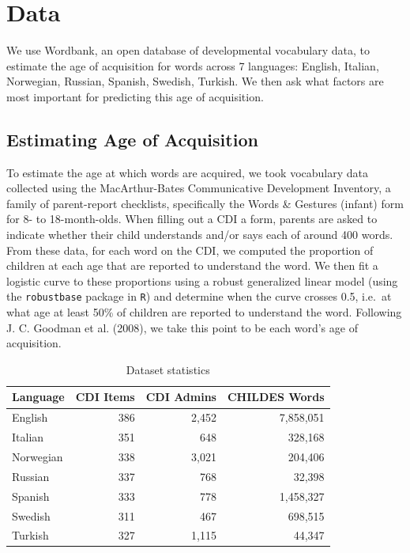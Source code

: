 \documentclass[10pt, letterpaper]{article}
\begin{document}
\section{Data}\label{data}

We use Wordbank, an open database of developmental vocabulary data, to
estimate the age of acquisition for words across 7 languages: English,
Italian, Norwegian, Russian, Spanish, Swedish, Turkish. We then ask what
factors are most important for predicting this age of acquisition.

\subsection{Estimating Age of
Acquisition}\label{estimating-age-of-acquisition}

To estimate the age at which words are acquired, we took vocabulary data
collected using the MacArthur-Bates Communicative Development Inventory,
a family of parent-report checklists, specifically the Words \& Gestures
(infant) form for 8- to 18-month-olds. When filling out a CDI a form,
parents are asked to indicate whether their child understands and/or
says each of around 400 words. From these data, for each word on the
CDI, we computed the proportion of children at each age that are
reported to understand the word. We then fit a logistic curve to these
proportions using a robust generalized linear model (using the
\texttt{robustbase} package in \texttt{R}) and determine when the curve
crosses 0.5, i.e.~at what age at least 50\% of children are reported to
understand the word. Following J. C. Goodman et al. (2008), we take this
point to be each word's age of acquisition.

\begin{table}[t]
\centering
\begin{tabular}{lrrr}
  \hline
Language & CDI Items & CDI Admins & CHILDES Words \\ 
  \hline
English & 386 & 2,452 & 7,858,051 \\ 
  Italian & 351 & 648 & 328,168 \\ 
  Norwegian & 338 & 3,021 & 204,406 \\ 
  Russian & 337 & 768 & 32,398 \\ 
  Spanish & 333 & 778 & 1,458,327 \\ 
  Swedish & 311 & 467 & 698,515 \\ 
  Turkish & 327 & 1,115 & 44,347 \\ 
   \hline
\end{tabular}
\caption{Dataset statistics} 
\end{table}
\end{document}
